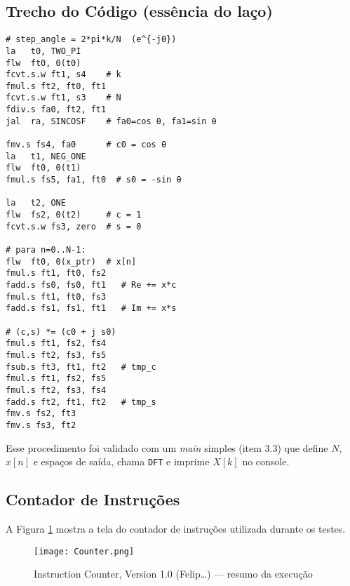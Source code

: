 \documentclass[12pt,a4paper]{article}
\begin{document}
\subsection*{Trecho do Código (essência do laço)}
\begin{lstlisting}[language=Assembly]
# step_angle = 2*pi*k/N  (e^{-jθ})
la   t0, TWO_PI
flw  ft0, 0(t0)
fcvt.s.w ft1, s4    # k
fmul.s ft2, ft0, ft1
fcvt.s.w ft1, s3    # N
fdiv.s fa0, ft2, ft1
jal  ra, SINCOSF    # fa0=cos θ, fa1=sin θ

fmv.s fs4, fa0      # c0 = cos θ
la   t1, NEG_ONE
flw  ft0, 0(t1)
fmul.s fs5, fa1, ft0  # s0 = -sin θ

la   t2, ONE
flw  fs2, 0(t2)     # c = 1
fcvt.s.w fs3, zero  # s = 0

# para n=0..N-1:
flw  ft0, 0(x_ptr)  # x[n]
fmul.s ft1, ft0, fs2
fadd.s fs0, fs0, ft1   # Re += x*c
fmul.s ft1, ft0, fs3
fadd.s fs1, fs1, ft1   # Im += x*s

# (c,s) *= (c0 + j s0)
fmul.s ft1, fs2, fs4
fmul.s ft2, fs3, fs5
fsub.s ft3, ft1, ft2   # tmp_c
fmul.s ft1, fs2, fs5
fmul.s ft2, fs3, fs4
fadd.s ft2, ft1, ft2   # tmp_s
fmv.s fs2, ft3
fmv.s fs3, ft2
\end{lstlisting}

Esse procedimento foi validado com um \textit{main} simples (item 3.3) que define $N$, $x[n]$ e espaços de saída, chama \texttt{DFT} e imprime $X[k]$ no console.

\subsection*{Contador de Instruções}
A Figura \ref{fig:counter} mostra a tela do contador de instruções utilizada durante os testes.
\begin{figure}[H]
\centering
\texttt{[image: Counter.png]}
\caption{Instruction Counter, Version 1.0 (Felip\dots) — resumo da execução}
\label{fig:counter}
\end{figure}
\end{document}
